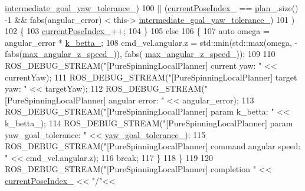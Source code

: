 \begin{DoxyCode}
      \hyperlink{classcl__move__base__z_1_1pure__spinning__local__planner_1_1PureSpinningLocalPlanner_a2e8dfda5e9dea6f09db4056aa90b2aa8}{intermediate\_goal\_yaw\_tolerance\_})
100          || (\hyperlink{classcl__move__base__z_1_1pure__spinning__local__planner_1_1PureSpinningLocalPlanner_aa0f9b4cf52a76e44dc2cfc5103d52dcd}{currentPoseIndex\_} == \hyperlink{classcl__move__base__z_1_1pure__spinning__local__planner_1_1PureSpinningLocalPlanner_a31875ee78bae4698b579e20c0754860d}{plan\_}.size() -1 && fabs(angular\_error) < this->
      \hyperlink{classcl__move__base__z_1_1pure__spinning__local__planner_1_1PureSpinningLocalPlanner_a2e8dfda5e9dea6f09db4056aa90b2aa8}{intermediate\_goal\_yaw\_tolerance\_})
101     )
102     \{
103       \hyperlink{classcl__move__base__z_1_1pure__spinning__local__planner_1_1PureSpinningLocalPlanner_aa0f9b4cf52a76e44dc2cfc5103d52dcd}{currentPoseIndex\_}++;
104     \}
105     \textcolor{keywordflow}{else}
106     \{
107       \textcolor{keyword}{auto} omega = angular\_error * \hyperlink{classcl__move__base__z_1_1pure__spinning__local__planner_1_1PureSpinningLocalPlanner_a379d2ba057231d76edd1a661d3572d68}{k\_betta\_};
108       cmd\_vel.angular.z = std::min(std::max(omega, -fabs(\hyperlink{classcl__move__base__z_1_1pure__spinning__local__planner_1_1PureSpinningLocalPlanner_a20edb2db356925684de4ee4fe03d5992}{max\_angular\_z\_speed\_})), fabs(
      \hyperlink{classcl__move__base__z_1_1pure__spinning__local__planner_1_1PureSpinningLocalPlanner_a20edb2db356925684de4ee4fe03d5992}{max\_angular\_z\_speed\_}));
109 
110       ROS\_DEBUG\_STREAM(\textcolor{stringliteral}{"[PureSpinningLocalPlanner] current yaw: "} << currentYaw);
111       ROS\_DEBUG\_STREAM(\textcolor{stringliteral}{"[PureSpinningLocalPlanner] target yaw: "} << targetYaw);
112       ROS\_DEBUG\_STREAM(\textcolor{stringliteral}{"[PureSpinningLocalPlanner] angular error: "} << angular\_error);
113       ROS\_DEBUG\_STREAM(\textcolor{stringliteral}{"[PureSpinningLocalPlanner] param k\_betta: "} << k\_betta\_);
114       ROS\_DEBUG\_STREAM(\textcolor{stringliteral}{"[PureSpinningLocalPlanner] param yaw\_goal\_tolerance: "} << 
      \hyperlink{classcl__move__base__z_1_1pure__spinning__local__planner_1_1PureSpinningLocalPlanner_a07334cd7bf29f391c2553f0038fa94e8}{yaw\_goal\_tolerance\_});
115       ROS\_DEBUG\_STREAM(\textcolor{stringliteral}{"[PureSpinningLocalPlanner] command angular speed: "} << cmd\_vel.angular.z);
116       \textcolor{keywordflow}{break};
117     \}
118   \}
119 
120   ROS\_DEBUG\_STREAM(\textcolor{stringliteral}{"[PureSpinningLocalPlanner] completion "} << \hyperlink{classcl__move__base__z_1_1pure__spinning__local__planner_1_1PureSpinningLocalPlanner_aa0f9b4cf52a76e44dc2cfc5103d52dcd}{currentPoseIndex\_} << \textcolor{stringliteral}{"/"}<< 

\end{DoxyCode}
